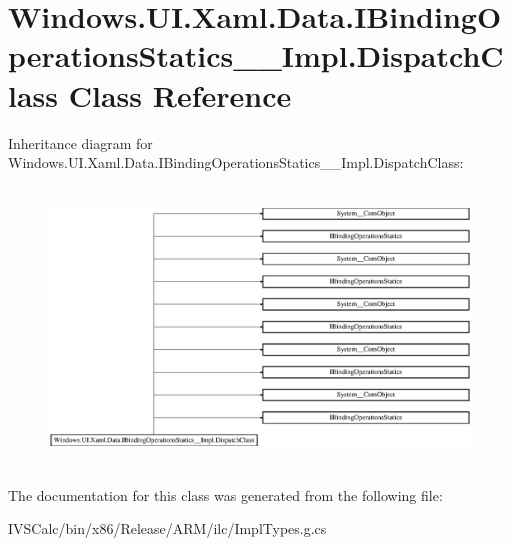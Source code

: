 \hypertarget{class_windows_1_1_u_i_1_1_xaml_1_1_data_1_1_i_binding_operations_statics_____impl_1_1_dispatch_class}{}\section{Windows.\+U\+I.\+Xaml.\+Data.\+I\+Binding\+Operations\+Statics\+\_\+\+\_\+\+Impl.\+Dispatch\+Class Class Reference}
\label{class_windows_1_1_u_i_1_1_xaml_1_1_data_1_1_i_binding_operations_statics_____impl_1_1_dispatch_class}
Inheritance diagram for Windows.\+U\+I.\+Xaml.\+Data.\+I\+Binding\+Operations\+Statics\+\_\+\+\_\+\+Impl.\+Dispatch\+Class\+:\begin{figure}[H]
\begin{center}
\leavevmode
\includegraphics[height=7.421687cm]{class_windows_1_1_u_i_1_1_xaml_1_1_data_1_1_i_binding_operations_statics_____impl_1_1_dispatch_class}
\end{center}
\end{figure}


The documentation for this class was generated from the following file\+:\begin{DoxyCompactItemize}
\item 
I\+V\+S\+Calc/bin/x86/\+Release/\+A\+R\+M/ilc/Impl\+Types.\+g.\+cs\end{DoxyCompactItemize}
